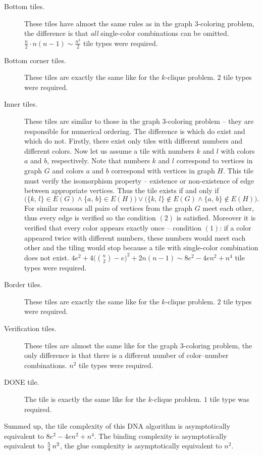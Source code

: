 \begin{description}
	\item[Bottom tiles.] These tiles have almost the same rules as in the graph 3-coloring problem, the difference is that {\em all} single-color combinations can be omitted. $\frac{n}{2} \cdot n(n-1) \sim \frac{n^3}{2}$ tile types were required.
	\item[Bottom corner tiles.] These tiles are exactly the same like for the $k$-clique problem. $2$ tile types were required.
	\item[Inner tiles.] These tiles are similar to those in the graph $3$-coloring problem -- they are responsible for numerical ordering. The difference is which do exist and which do not. Firstly, there exist only tiles with different numbers and different colors. Now let us assume a tile with numbers $k$ and $l$ with colors $a$ and $b$, respectively. Note that numbers $k$ and $l$ correspond to vertices in graph $G$ and colors $a$ and $b$ correspond with vertices in graph $H$. This tile must verify the isomorphism property -- existence or non-existence of edge between appropriate vertices. Thus the tile exists if and only if
	$$\bigl(\{k,\,l\} \in E(G) \wedge \{a,\,b\} \in E(H)\bigr) \vee \bigl(\{k,\,l\} \notin E(G) \wedge \{a,\,b\} \notin E(H)\bigr) . $$
	For similar reasons all pairs of vertices from the graph $G$ meet each other, thus every edge is verified so the condition $(2)$ is satisfied. Moreover it is verified that every color appears exactly once -- condition $(1)$: if a color appeared twice with different numbers, these numbers would meet each other and the tiling would stop because a tile with single-color combination does not exist. $4e^2 + 4\bigl(\binom{n}{2}-e\bigr)^2 + 2n(n-1) \sim 8e^2 - 4en^2 + n^4$ tile types were required.
	\item[Border tiles.] These tiles are exactly the same like for the $k$-clique problem. $2$ tile types were required.
	\item[Verification tiles.] These tiles are almost the same like for the graph $3$-coloring problem, the only difference is that there is a different number of color--number combinations. $n^2$ tile types were required.
	\item[DONE tile.] The tile is exactly the same like for the $k$-clique problem. $1$ tile type was required.
\end{description}

Summed up, the tile complexity of this DNA algorithm is asymptotically equivalent to $8e^2 - 4en^2 + n^4$. The binding complexity is asymptotically equivalent to $\nicefrac{5}{4}\,n^2$, the glue complexity is asymptotically equivalent to $n^2$.


